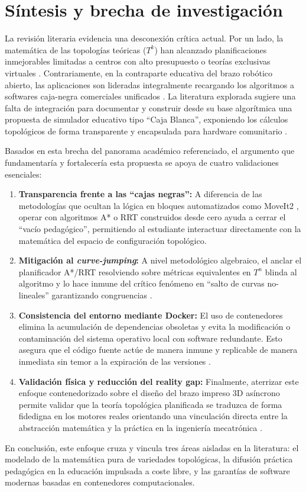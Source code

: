 \section{Síntesis y brecha de investigación}

La revisión literaria evidencia una desconexión crítica actual. Por un lado, 
la matemática de las topologías teóricas ($T^k$) han alcanzado planificaciones 
inmejorables limitadas a centros con alto presupuesto o teorías exclusivas 
virtuales \parencite{radhakrishnan2024state}. Contrariamente, en la contraparte 
educativa del brazo robótico abierto, las aplicaciones son lideradas integralmente 
recargando los algoritmos a softwares caja-negra comerciales unificados 
\parencite{semwal2024manipulator, vega2025g}. La literatura explorada sugiere 
una falta de integración para documentar y construir desde su base algorítmica 
una propuesta de simulador educativo tipo \enquote{Caja Blanca}, exponiendo los 
cálculos topológicos de forma transparente y encapsulada para hardware 
comunitario \parencite{cervera2023run, de2025development}.

Basados en esta brecha del panorama académico referenciado, el argumento que 
fundamentaría y fortalecería esta propuesta se apoya de cuatro validaciones esenciales:

\begin{enumerate}
    \item \textbf{Transparencia frente a las \enquote{cajas negras}:} A diferencia de 
    las metodologías que ocultan la lógica en bloques automatizados como MoveIt2 
    \parencite{semwal2024manipulator}, operar con algoritmos A* o RRT construidos 
    desde cero ayuda a cerrar el \enquote{vacío pedagógico}, permitiendo al estudiante 
    interactuar directamente con la matemática del espacio de configuración topológico.
    \item \textbf{Mitigación al \textit{curve-jumping}:} A nivel metodológico 
    algebraico, el anclar el planificador A*/RRT resolviendo sobre métricas equivalentes 
    en $T^n$ blinda al algoritmo y lo hace inmune del crítico fenómeno en 
    \enquote{salto de curvas no-lineales} garantizando congruencias 
    \parencite{radhakrishnan2024state2, velez2022novel}.
    \item \textbf{Consistencia del entorno mediante Docker:} El uso de contenedores 
    elimina la acumulación de dependencias obsoletas y evita la modificación o 
    contaminación del sistema operativo local con software redundante. Esto asegura 
    que el código fuente actúe de manera inmune y replicable de manera inmediata sin 
    temor a la expiración de las versiones \parencite{cervera2023run}.
    \item \textbf{Validación física y reducción del reality gap:} Finalmente,
     aterrizar este enfoque contenedorizado sobre el diseño del brazo impreso 
     3D asíncrono permite validar que la teoría topológica planificada se traduzca 
     de forma fidedigna en los motores reales orientando una vinculación directa entre 
     la abstracción matemática y la práctica en la ingeniería mecatrónica 
     \parencite{de2025development}.
\end{enumerate}

En conclusión, este enfoque cruza y vincula tres áreas aisladas en la literatura: 
el modelado de la matemática pura de variedades topológicas, la difusión práctica 
pedagógica en la educación impulsada a coste libre, y las garantías de software 
modernas basadas en contenedores computacionales.